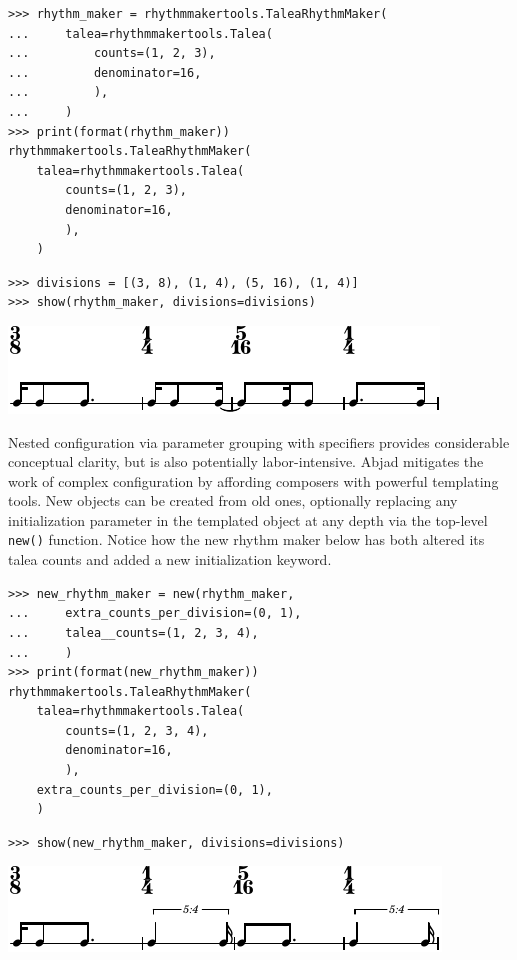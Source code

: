 \documentclass{article}
\begin{document}
\begin{lstlisting}
>>> rhythm_maker = rhythmmakertools.TaleaRhythmMaker(
...     talea=rhythmmakertools.Talea(
...         counts=(1, 2, 3),
...         denominator=16,
...         ),
...     )
>>> print(format(rhythm_maker))
rhythmmakertools.TaleaRhythmMaker(
    talea=rhythmmakertools.Talea(
        counts=(1, 2, 3),
        denominator=16,
        ),
    )
\end{lstlisting}


\begin{lstlisting}
>>> divisions = [(3, 8), (1, 4), (5, 16), (1, 4)]
>>> show(rhythm_maker, divisions=divisions)
\end{lstlisting}

\noindent\includegraphics[scale=1.0]{images/abjad-12.pdf}


Nested configuration via parameter grouping with specifiers provides
considerable conceptual clarity, but is also potentially labor-intensive. Abjad
mitigates the work of complex configuration by affording composers with
powerful templating tools. New objects can be created from old ones, optionally
replacing any initialization parameter in the templated object at any depth via
the top-level \texttt{new()} function. Notice how the new rhythm maker below
has both altered its talea counts and added a new initialization keyword.

\begin{lstlisting}
>>> new_rhythm_maker = new(rhythm_maker,
...     extra_counts_per_division=(0, 1),
...     talea__counts=(1, 2, 3, 4),
...     )
>>> print(format(new_rhythm_maker))
rhythmmakertools.TaleaRhythmMaker(
    talea=rhythmmakertools.Talea(
        counts=(1, 2, 3, 4),
        denominator=16,
        ),
    extra_counts_per_division=(0, 1),
    )
\end{lstlisting}


\begin{lstlisting}
>>> show(new_rhythm_maker, divisions=divisions)
\end{lstlisting}

\noindent\includegraphics[scale=1.0]{images/abjad-13.pdf}
\end{document}
